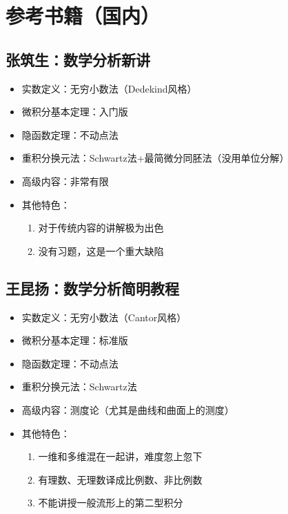 \documentclass[UTF8]{article}
\begin{document}
    \section{参考书籍（国内）}
    \subsection{张筑生：数学分析新讲}
    \begin{itemize}
        \item 实数定义：无穷小数法（Dedekind风格）
        \item 微积分基本定理：入门版
        \item 隐函数定理：不动点法
        \item 重积分换元法：Schwartz法+最简微分同胚法（没用单位分解）
        \item 高级内容：非常有限
        \item 其他特色：\begin{enumerate}
            \item 对于传统内容的讲解极为出色
            \item 没有习题，这是一个重大缺陷
        \end{enumerate}
    \end{itemize}
    \subsection{王昆扬：数学分析简明教程}
    \begin{itemize}
        \item 实数定义：无穷小数法（Cantor风格）
        \item 微积分基本定理：标准版
        \item 隐函数定理：不动点法
        \item 重积分换元法：Schwartz法
        \item 高级内容：测度论（尤其是曲线和曲面上的测度）
        \item 其他特色：\begin{enumerate}
            \item 一维和多维混在一起讲，难度忽上忽下
            \item 有理数、无理数译成比例数、非比例数
            \item 不能讲授一般流形上的第二型积分
        \end{enumerate}
    \end{itemize}
\end{document}
